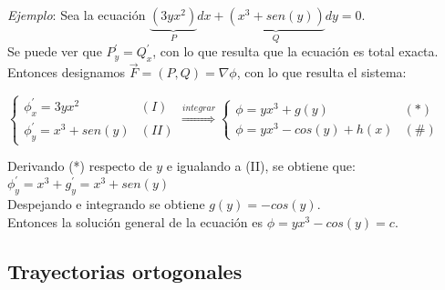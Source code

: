\documentclass[a4paper, twoside]{article}
\numberwithin{equation}{section}
\numberwithin{figure}{section}
\numberwithin{table}{section}
\begin{document}
			\vspace{1.5cm}
			
				\emph{Ejemplo}: Sea la ecuación $\underbrace{(3yx^2)}_{P}dx+\underbrace{(x^3+sen(y))}_{Q}dy=0$.\\
				
				Se puede ver que $P^\prime_{y}=Q^\prime_{x}$, con lo que resulta que la ecuación es total exacta.\\
				
				Entonces designamos $\vec{F}=(P,Q)=\nabla\phi$, con lo que resulta el sistema:
								
				\begin{center}
					$\begin{cases}
					\phi^\prime_{x}=3yx^2 & (I)\\
					\phi^\prime_{y}=x^3+sen(y) & (II)\end{cases}\overset{integrar}{\Rightarrow}\begin{cases}
					\phi=yx^3+g(y) & (*)\\
					\phi=yx^3-cos(y)+h(x) & (\#)\end{cases}$
				\end{center}
				
			Derivando ({*}) respecto de $y$ e igualando a (II), se obtiene que:$\phi^\prime_{y}=x^3+g^\prime_{y}=x^3+sen(y)$\\
			
			 Despejando e integrando se obtiene $g(y)=-cos(y)$.\\
			 
			 Entonces la solución general de la ecuación es $\phi=yx^3-cos(y)=c$.
		
		\subsection{Trayectorias ortogonales}
			
\end{document}

